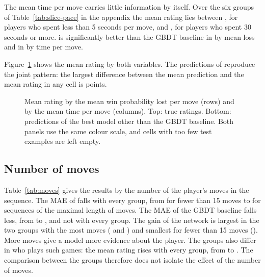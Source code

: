 \documentclass[11pt]{article}
\begin{document}
The mean time per move carries little information by itself. Over the six
groups of Table~\ref{tab:slice-pace} in the appendix the mean rating lies
between , for players who spent less than 5 seconds
per move, and , for players who spent 30 seconds
or more.  is significantly better than the GBDT baseline
in  by mean loss and in  by
time per move.

Figure~\ref{fig:grid-loss} shows the mean rating by both variables. The
predictions of  reproduce the joint pattern: the largest
difference between the mean prediction and the mean rating in any cell is
 points.

\begin{figure}[htbp]\centering
{}

\medskip
{}
\caption{Mean rating by the mean win probability lost per move (rows) and by
the mean time per move (columns). Top: true ratings. Bottom: predictions of
the best model other than the GBDT baseline. Both panels use the same colour
scale, and cells with too few test examples are left empty.}
\label{fig:grid-loss}
\end{figure}

\subsection{Number of moves}
\label{sec:moves}

Table~\ref{tab:moves} gives the results by the number of the player's moves
in the sequence. The MAE of  falls with every group, from
 for fewer than 15 moves to
 for sequences of the maximal length of
 moves. The MAE of the GBDT baseline falls less, from
 to , and not with
every group. The gain of the network is largest in the two groups with the
most moves ( and ) and
smallest for fewer than 15 moves (). More moves give
a model more evidence about the player. The groups also differ in who plays
such games: the mean rating rises with every group, from
 to . The comparison
between the groups therefore does not isolate the effect of the number of
moves.
\end{document}
